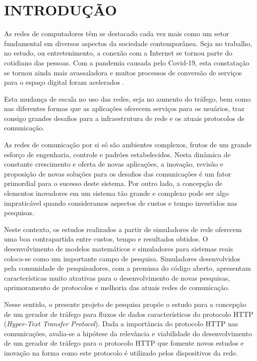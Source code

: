 \newpage

\section{INTRODUÇÃO}
\label{sec:introdução}
As redes de computadores têm se destacado cada vez mais como um setor fundamental em diversos aspectos da sociedade contemporânea. Seja no trabalho, no estudo, ou entretenimento, a conexão com a Internet se tornou parte do cotidiano das pessoas. Com a pandemia causada pelo Covid-19, esta constatação se tornou ainda mais avassaladora e muitos processos de conversão de serviços para o espaço digital foram acelerados \cite{Lavado2020} \cite{Johnson2021}.

Esta mudança de escala no uso das redes, seja no aumento do tráfego, bem como nas diferentes formas que as aplicações oferecem serviços para os usuários, traz consigo grandes desafios para a infraestrutura de rede e os atuais protocolos de comunicação.

As redes de comunicação por si só são ambientes complexos, frutos de um grande esforço de engenharia, controle e padrões estabelecidos. Nesta dinâmica de constante crescimento e oferta de novas aplicações, a inovação, revisão e proposição de novas soluções para os desafios das comunicações é um fator primordial para o sucesso deste sistema. Por outro lado, a concepção de elementos inovadores em um sistema tão grande e complexo pode ser algo impraticável quando consideramos aspectos de custos e tempo investidos nas pesquisas.

Neste contexto, os estudos realizados a partir de simuladores de rede oferecem uma boa contrapartida entre custos, tempo e resultados obtidos. O desenvolvimento de modelos matemáticos e simuladores para sistemas reais coloca-se como um importante campo de pesquisa. Simuladores desenvolvidos pela comunidade de pesquisadores, com a premissa do código aberto, apresentam características muito atrativas para o desenvolvimento de novas pesquisas, aprimoramento de protocolos e melhoria das atuais redes de comunicação.

Nesse sentido, o presente projeto de pesquisa propõe o estudo para a concepção de um gerador de tráfego para fluxos de dados característicos do protocolo HTTP (\textit{Hyper-Text Transfer Protocol}). Dada a importância do protocolo HTTP nas comunicações, avalia-se a hipótese da relevância e viabilidade do desenvolvimento de um gerador de tráfego para o protocolo HTTP que fomente novos estudos e inovação na forma como este protocolo é utilizado pelos dispositivos da rede.

